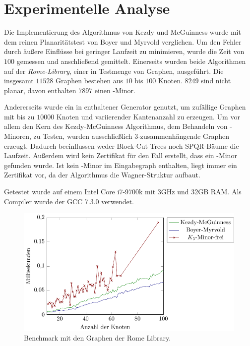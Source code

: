 \chapter{Experimentelle Analyse}
\label{cha:analyse}

Die Implementierung des Algorithmus von Kezdy und McGuinness wurde mit dem reinen Planaritätstest von Boyer und Myrvold verglichen.
Um den Fehler durch äußere Einflüsse bei geringer Laufzeit zu minimieren, wurde die Zeit von $100$ gemessen und anschließend gemittelt.
Einerseits wurden beide Algorithmen auf der \emph{Rome-Library}, einer in \cite{BGLT+97} Testmenge von Graphen, ausgeführt.
Die insgesamt $11528$ Graphen bestehen aus $10$ bis $100$ Knoten.
$8249$ sind nicht planar, davon enthalten $7897$ einen \kf-Minor.

Andererseits wurde ein in \OGDF enthaltener Generator genutzt, um zufällige Graphen mit bis zu $10000$ Knoten und variierender Kantenanzahl zu erzeugen.
Um vor allem den Kern des Kezdy-McGuinness Algorithmus, dem Behandeln von \kdd-Minoren, zu Testen, wurden ausschließlich $3$-zusammenhängende Graphen erzeugt.
Dadurch beeinflussen weder Block-Cut Trees noch SPQR-Bäume die Laufzeit.
Außerdem wird kein Zertifikat für den Fall erstellt, dass ein \kf-Minor gefunden wurde.
Ist kein \kf-Minor im Eingabegraph enthalten, liegt immer ein Zertifikat vor, da der Algorithmus die Wagner-Struktur aufbaut.

Getestet wurde auf einem Intel Core i7-9700k mit 3GHz und 32GB RAM.
Als Compiler wurde der GCC 7.3.0 verwendet.

\begin{figure}[H]
  \centering
  \includegraphics[width=\textwidth,height=\textheight,keepaspectratio]{plots/Benchmarks_Rome.pdf}
  \caption{Benchmark mit den Graphen der Rome Library.}
  \label{fig:Benchmarks-Rome}
\end{figure}


